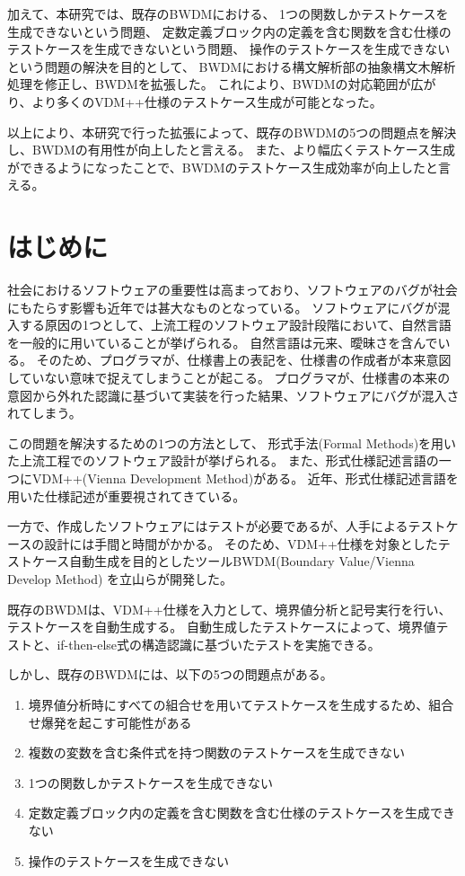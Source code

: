 \documentclass[uplatex, report, a4j, 10pt]{jsbook}
\begin{document}
加えて、本研究では、既存のBWDMにおける、
1つの関数しかテストケースを生成できないという問題、
定数定義ブロック内の定義を含む関数を含む仕様のテストケースを生成できないという問題、
操作のテストケースを生成できないという問題の解決を目的として、
BWDMにおける構文解析部の抽象構文木解析処理を修正し、BWDMを拡張した。
これにより、BWDMの対応範囲が広がり、より多くのVDM++仕様のテストケース生成が可能となった。

以上により、本研究で行った拡張によって、既存のBWDMの5つの問題点を解決し、BWDMの有用性が向上したと言える。
また、より幅広くテストケース生成ができるようになったことで、BWDMのテストケース生成効率が向上したと言える。

%
\chapter{はじめに}\label{cha:Introduction}
社会におけるソフトウェアの重要性は高まっており、ソフトウェアのバグが社会にもたらす影響も近年では甚大なものとなっている\cite{mizuho}。
ソフトウェアにバグが混入する原因の1つとして、上流工程のソフトウェア設計段階において、自然言語を一般的に用いていることが挙げられる\cite{seminarFormalMethod}。
自然言語は元来、曖昧さを含んでいる。
そのため、プログラマが、仕様書上の表記を、仕様書の作成者が本来意図していない意味で捉えてしまうことが起こる。
プログラマが、仕様書の本来の意図から外れた認識に基づいて実装を行った結果、ソフトウェアにバグが混入されてしまう。

この問題を解決するための1つの方法として、
形式手法(Formal Methods)\cite{programSpecification}を用いた上流工程でのソフトウェア設計が挙げられる。
また、形式仕様記述言語の一つにVDM++(Vienna Development Method)がある\cite{vdm_manual}。
近年、形式仕様記述言語を用いた仕様記述が重要視されてきている\cite{seminarFormalMethod}。

一方で、作成したソフトウェアにはテストが必要であるが、人手によるテストケースの設計には手間と時間がかかる。
そのため、VDM++仕様を対象としたテストケース自動生成を目的としたツールBWDM(Boundary Value/Vienna Develop Method)
を立山らが開発した\cite{tachiyama8, tachiyama6}。

既存のBWDMは、VDM++仕様を入力として、境界値分析と記号実行を行い、テストケースを自動生成する。
自動生成したテストケースによって、境界値テストと、if-then-else式の構造認識に基づいたテストを実施できる。

しかし、既存のBWDMには、以下の5つの問題点がある。

\begin{enumerate}[label=(\alph*)]
  \item\label{problem:1} 境界値分析時にすべての組合せを用いてテストケースを生成するため、組合せ爆発を起こす可能性がある
  \item\label{problem:2} 複数の変数を含む条件式を持つ関数のテストケースを生成できない
  \item\label{problem:3} 1つの関数しかテストケースを生成できない
  \item\label{problem:4} 定数定義ブロック内の定義を含む関数を含む仕様のテストケースを生成できない
  \item\label{problem:5} 操作のテストケースを生成できない
\end{enumerate}
\end{document}
